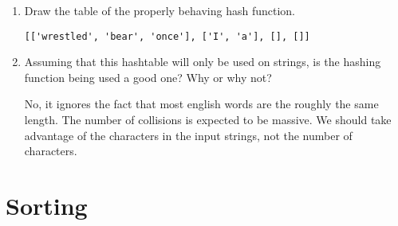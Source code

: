 \documentclass[11pt]{article}
\newenvironment{answer}{\large\lstset{basicstyle=\large}\color{white}}{}
\newenvironment{answer}{\large\lstset{basicstyle=\large}\color{red}}{}
\begin{document}
\begin{enumerate}
\begin{enumerate}
\begin{answer}
        \end{answer}

    \item Draw the table of the properly behaving hash function.
        
        \begin{answer}
		\begin{lstlisting}[numbers=none]
[['wrestled', 'bear', 'once'], ['I', 'a'], [], []]
		\end{lstlisting}
    \end{answer}
\item Assuming that this hashtable will only be used on strings, is the hashing function being used a good one? Why or why not?

    \begin{answer}
        No, it ignores the fact that most english words are the roughly the same length. The number of collisions is expected to be massive. We should take advantage of the characters in the input strings, not the number of characters.
    \end{answer}
    \end{enumerate}


\section*{Sorting}


\end{enumerate}
\end{document}
